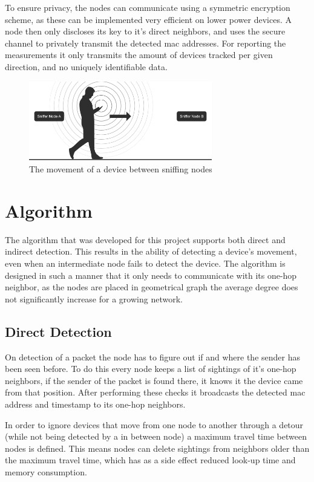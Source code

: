 \documentclass{IEEEtran}
\begin{document}
To ensure privacy, the nodes can communicate using a symmetric encryption scheme, as these can be implemented very efficient on lower power devices. A node then only discloses its key to it's direct neighbors, and uses the secure channel to privately transmit the detected mac addresses. For reporting the measurements it only transmits the amount of devices tracked per given direction, and no uniquely identifiable data. 

\begin{figure}
    \centering
    \includegraphics[width=80mm]{images/walkingman.png}
    \caption{The movement of a device between sniffing nodes}
    \label{fig:walkingman}
\end{figure}

\section{Algorithm}\label{sec:algorithm}
The algorithm that was developed for this project supports both direct and indirect detection. This results in the ability of detecting a device's movement, even when an intermediate node fails to detect the device. The algorithm is designed in such a manner that it only needs to communicate with its one-hop neighbor, as the nodes are placed in geometrical graph  the average degree does not significantly increase for a growing network.

\subsection{Direct Detection}
On detection of a packet the node has to figure out if and where the sender has been seen before. To do this every node keeps a list of sightings of it's one-hop neighbors, if the sender of the packet is found there, it knows it the device came from that position. After performing these checks it broadcasts the detected mac address and timestamp to its one-hop neighbors.

In order to ignore devices that move from one node to another through a detour (while not being detected by a in between node) a maximum travel time between nodes is defined. This means nodes can delete sightings from neighbors older than the maximum travel time, which has as a side effect reduced look-up time and memory consumption.
\end{document}
